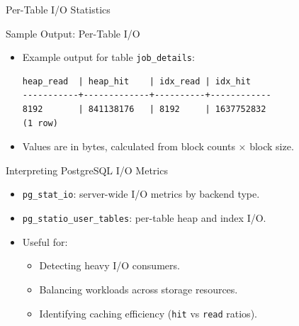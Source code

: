 \documentclass[aspectratio=169]{beamer}
\begin{document}
\begin{frame}[fragile]{Per-Table I/O Statistics}
\end{frame}

\begin{frame}[fragile]{Sample Output: Per-Table I/O}
\begin{itemize}
    \item Example output for table \texttt{job\_details}:
\begin{verbatim}
heap_read  | heap_hit    | idx_read | idx_hit
-----------+-------------+----------+------------
8192       | 841138176   | 8192     | 1637752832
(1 row)
\end{verbatim}
    \item Values are in bytes, calculated from block counts × block size.
\end{itemize}
\end{frame}

\begin{frame}{Interpreting PostgreSQL I/O Metrics}
\begin{itemize}
    \item \texttt{pg\_stat\_io}: server-wide I/O metrics by backend type.
    \item \texttt{pg\_statio\_user\_tables}: per-table heap and index I/O.
    \item Useful for:
    \begin{itemize}
        \item Detecting heavy I/O consumers.
        \item Balancing workloads across storage resources.
        \item Identifying caching efficiency (\texttt{hit} vs \texttt{read} ratios).
    \end{itemize}
\end{itemize}
\end{frame}
\end{document}
